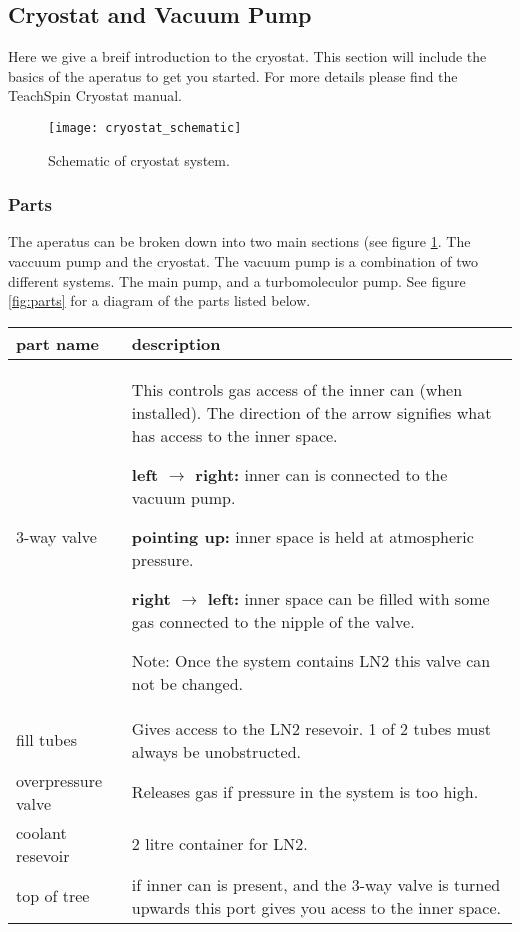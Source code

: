 \documentclass[m_cmp_sc_manual.tex]{subfiles}
\begin{document}
\subsection{Cryostat and Vacuum Pump}
Here we give a breif introduction to the cryostat. This section will include the
basics of the aperatus to get you started. For more details please find the
TeachSpin Cryostat manual. 

\begin{figure}
  \texttt{[image: cryostat\_schematic]}
  \caption{\label{fig:cryostat} Schematic of cryostat system.}
\end{figure}

\subsubsection{Parts}
The aperatus can be broken down into two main sections (see figure
\ref{fig:cryostat}. The vaccuum pump and the
cryostat. The vacuum pump is a combination of two different systems. The main
pump, and a turbomoleculor pump. See figure \ref{fig:parts} for a diagram of the
parts listed below.

\begin{tabular}{m{4cm}|m{10cm}}
  \hline
  part name & description \\
  \hline
  3-way valve & 
  This controls gas access of the inner can (when installed). The direction of
  the arrow signifies what has access to the inner space. 

  \textbf{left $\rightarrow$ right:} inner can is connected to the vacuum pump.

  \textbf{pointing up:} inner space is held at atmospheric pressure.

  \textbf{right $\rightarrow$ left:} inner space can be filled with some gas connected to the
      nipple of the valve. 

  Note: Once the system contains LN2 this valve can not be changed.\\ 
  \hline
  fill tubes & Gives access to the LN2 resevoir. 1 of 2 tubes must always be
  unobstructed. \\
  \hline
  overpressure valve & Releases gas if pressure in the system is too high.\\
  \hline
  coolant resevoir & 2 litre container for LN2. \\
  \hline
  top of tree & if inner can is present, and the 3-way valve is turned upwards
  this port gives you acess to the inner space. \\
  \hline
\end{tabular}
\end{document}
